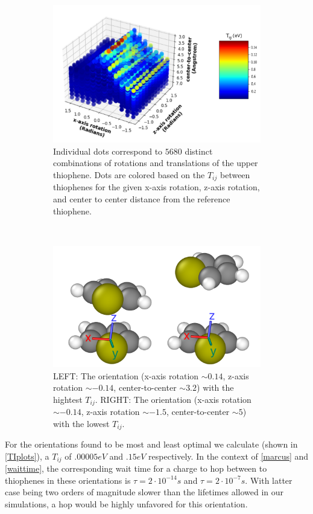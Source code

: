\begin{figure}
\centering
\begin{subfigure}{.9\textwidth}
    \centering
    \includegraphics[width=\textwidth]{figures/transfer_integral_plot.png}
    \caption{Individual dots correspond to $5680$ 
    distinct combinations of rotations and translations of the upper
    thiophene.
    Dots are colored based on the $T_{ij}$ between thiophenes for the given x-axis rotation,
    z-axis rotation, and center to
    center distance from the reference thiophene.}
\end{subfigure}
\\
\begin{subfigure}{.9\textwidth}
    \centering
    \includegraphics[width=.5\textwidth]{figures/thiophene-oreintations.png}
    \caption{LEFT: The orientation (x-axis rotation ${\sim}0.14$, z-axis rotation ${\sim}-0.14$, center-to-center ${\sim}3.2$)
    with the hightest $T_{ij}$. RIGHT: The orientation (x-axis rotation ${\sim}-0.14$, z-axis rotation
    ${\sim}-1.5$,
    center-to-center ${\sim}5$) with the lowest $T_{ij}$.}
\end{subfigure}%
\caption{ }
\label{TIplots}
\end{figure}

For the orientations found to be most and least optimal we calculate (shown in \autoref{TIplots}),
a $T_{ij}$ of $.00005eV$ and $.15eV$ respectively. In the context of \autoref{marcus} and \autoref{waittime},
the corresponding wait time for a charge to hop between to thiophenes in these orientations is $\tau = 2
\cdot 10^{-14}s$ and $\tau = 2 \cdot 10^{-7}s$. With latter case being two orders of magnitude slower than the
lifetimes allowed in our  simulations, a hop would be highly unfavored for this orientation. 

